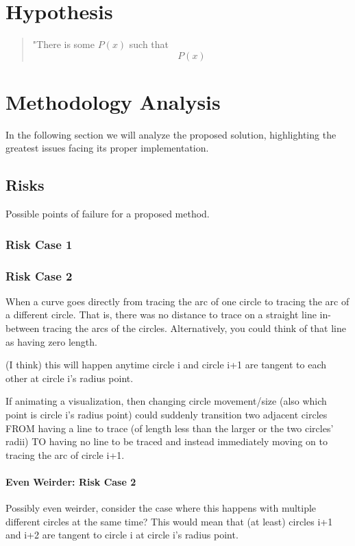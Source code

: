 \documentclass[sigconf]{acmart}
\begin{document}
\section{Hypothesis}
\begin{quote}
    "There is some $P(x)$ such that \[P(x) \]
\end{quote}
\section{Methodology Analysis}
In the following section we will analyze the proposed solution, highlighting the greatest issues facing its proper implementation. 


\subsection{\textbf{Risks}}
Possible points of failure for a proposed method. 

\subsubsection{\textbf{Risk Case 1}}


\subsubsection{\textbf{Risk Case 2}}
When a curve goes directly from tracing the arc of one circle to tracing the arc of a different circle. That is, there was no distance to trace on a straight line in-between tracing the arcs of the circles. Alternatively, you could think of that line as having zero length. 

(I think) this will happen anytime circle i and circle i+1 are tangent to each other at circle i's radius point. 

If animating a visualization, then changing circle movement/size (also which point is circle i's radius point) could suddenly transition two adjacent circles FROM having a line to trace (of length less than the larger or the two circles' radii) TO having no line to be traced and instead immediately moving on to tracing the arc of circle i+1.


\paragraph{\textbf{Even Weirder: Risk Case 2}}
Possibly even weirder, consider the case where this happens with multiple different circles at the same time? This would mean that (at least) circles i+1 and i+2 are tangent to circle i at circle i's radius point.
\end{document}
